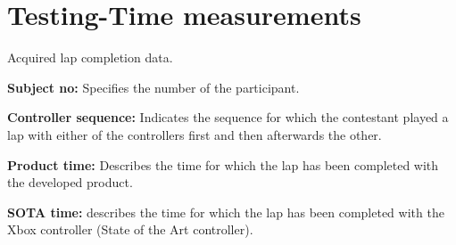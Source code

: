 \section{Testing-Time measurements} \label{app:time}
Acquired lap completion data.



\noindent\textbf{Subject no:} Specifies the number of the participant.


\noindent\textbf{Controller sequence:} Indicates the sequence for which the contestant played a lap with either of the controllers first and then afterwards the other.


\noindent\textbf{Product time:} Describes the time for which the lap has been completed with the developed product.


\noindent\textbf{SOTA time:} describes the time for which the lap has been completed with the Xbox controller (State of the Art controller).
